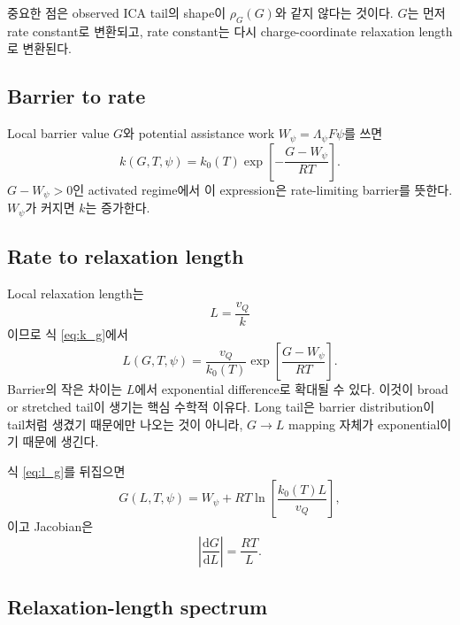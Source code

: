 \documentclass[11pt]{article}
\newcommand{\dd}{\mathrm{d}}
\begin{document}
중요한 점은 observed ICA tail의 shape이 \(\rho_G(G)\)와 같지 않다는 것이다. \(G\)는 먼저 rate
constant로 변환되고, rate constant는 다시 charge-coordinate relaxation length로 변환된다.

\subsection{Barrier to rate}\label{subsec:g_to_k}

Local barrier value \(G\)와 potential assistance work \(W_\psi=\Lambda_\psi F\psi\)를 쓰면
\begin{equation}
\boxed{
k(G,T,\psi)
=
k_0(T)
\exp\!\left[
-\frac{G-W_\psi}{RT}
\right].
}
\label{eq:k_g}
\end{equation}
\(G-W_\psi>0\)인 activated regime에서 이 expression은 rate-limiting barrier를 뜻한다.
\(W_\psi\)가 커지면 \(k\)는 증가한다.

\subsection{Rate to relaxation length}\label{subsec:k_to_l}

Local relaxation length는
\begin{equation}
L=\frac{v_Q}{k}
\label{eq:l_def}
\end{equation}
이므로 식 \eqref{eq:k_g}에서
\begin{equation}
\boxed{
L(G,T,\psi)
=
\frac{v_Q}{k_0(T)}
\exp\!\left[
\frac{G-W_\psi}{RT}
\right].
}
\label{eq:l_g}
\end{equation}
Barrier의 작은 차이는 \(L\)에서 exponential difference로 확대될 수 있다. 이것이 broad or stretched
tail이 생기는 핵심 수학적 이유다. Long tail은 barrier distribution이 tail처럼 생겼기 때문에만
나오는 것이 아니라, \(G\rightarrow L\) mapping 자체가 exponential이기 때문에 생긴다.

식 \eqref{eq:l_g}를 뒤집으면
\begin{equation}
G(L,T,\psi)
=
W_\psi
+
RT\ln\!\left[
\frac{k_0(T)L}{v_Q}
\right],
\label{eq:g_l}
\end{equation}
이고 Jacobian은
\begin{equation}
\left|
\frac{\dd G}{\dd L}
\right|
=
\frac{RT}{L}.
\label{eq:jacobian}
\end{equation}

\subsection{Relaxation-length spectrum}\label{subsec:length_spectrum}
\end{document}
